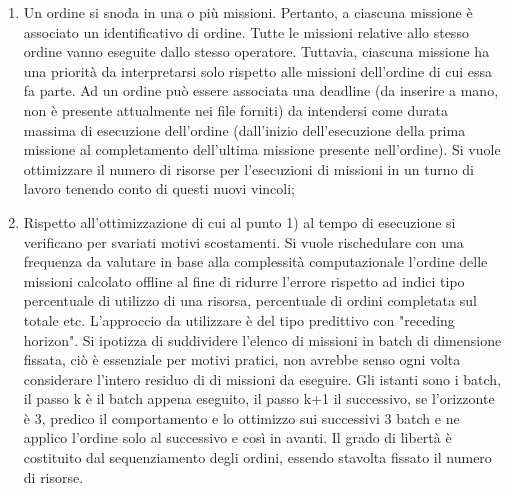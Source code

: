 \begin{enumerate}
	\item Un ordine si snoda in una o più missioni. Pertanto, a ciascuna
	missione è associato un identificativo di ordine. Tutte le missioni
	relative allo stesso ordine vanno eseguite dallo stesso operatore.
	Tuttavia, ciascuna missione ha una priorità da interpretarsi solo
	rispetto alle missioni dell'ordine di cui essa fa parte. Ad un ordine
	può essere associata una deadline (da inserire a mano, non è presente
	attualmente nei file forniti) da intendersi come durata massima di
	esecuzione dell'ordine (dall'inizio dell'esecuzione della prima missione
	al completamento dell'ultima missione presente nell'ordine).
	Si vuole ottimizzare il numero di risorse per l'esecuzioni di missioni
	in un turno di lavoro tenendo conto di questi nuovi vincoli;
	\item Rispetto all'ottimizzazione di cui al punto 1) al tempo di esecuzione
	si verificano per svariati motivi scostamenti. Si vuole rischedulare con
	una frequenza da valutare in base alla complessità computazionale
	l'ordine delle missioni calcolato offline al fine di ridurre l'errore
	rispetto ad indici tipo percentuale di utilizzo di una risorsa,
	percentuale di ordini completata sul totale etc. L'approccio da
	utilizzare è del tipo predittivo con "receding horizon". Si ipotizza di
	suddividere l'elenco di missioni in batch di dimensione fissata, ciò è
	essenziale per motivi pratici, non avrebbe senso ogni volta considerare
	l'intero residuo di di missioni da eseguire. Gli istanti sono i batch,
	il passo k è il batch appena eseguito, il passo k+1 il successivo, se
	l'orizzonte è 3, predico il comportamento e lo ottimizzo sui successivi
	3 batch e ne applico l'ordine solo al successivo e così in avanti. Il
	grado di libertà è costituito dal sequenziamento degli ordini, essendo
	stavolta fissato il numero di risorse.
\end{enumerate}
